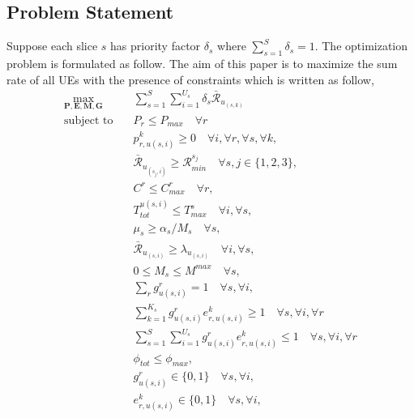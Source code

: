 \documentclass[conference]{IEEEtran}
\begin{document}
\subsection{Problem Statement}
Suppose each slice $s$ has priority factor $\delta_s$ where $\sum_{s=1}^S \delta_s =1$.
The optimization problem is formulated as follow.
The aim of this paper is to maximize the sum rate of all UEs with the presence of constraints which is written as follow,
\begin{subequations}\label{problem}
\begin{alignat}{4}
\max\limits_{\boldsymbol{P}, \boldsymbol{E}, \boldsymbol{M}, \boldsymbol{G} }   \quad &  \sum_{s=1}^{S}\sum_{i=1}^{U_s}\delta_s \bar{\mathcal{R}}_{u_{(s,k)}} \ \\
\text{subject to} \quad  &  P_r \leq P_{max} \quad \forall r
 \label{c11} \\
&p_{r,u(s,i)}^{k}  \geq 0  \quad \forall i,\forall r,\forall s, \forall k,\label{c12} \\
&\bar{\mathcal{R}}_{u_{(s_j,i)}} \geq \mathcal{R}_{min}^{s_j} \quad \forall s, j \in \{1,2,3\}, \label{c13} \\
& C^r \leq C_{max}^r \quad \forall r, \label{c15}\\ 
&T_{tot}^{u(s,i)}  \leq T_{max}^{s} \quad \forall i,\forall s,\label{c16} \\
& \mu_s \geq \alpha_s/M_s \quad \forall s,\label{c16-1} \\
& \bar{\mathcal{R}}_{u_{(s,i)}} \geq {\lambda}_{u_{(s,i)}} \quad \forall i,\forall s,\label{c16-2} \\
& 0 \leq M_s \leq M^{max}  \quad \forall s,\label{c16-3}\\
& \sum_{r}g^r_{u(s,i)} = 1  \quad \forall s,\forall i, \label{c17}  \\
& \sum_{k =1}^{K_s} g^r_{u(s,i)} e^{k}_{r,u(s,i)} \geq 1  \quad \forall s,\forall i ,\forall r \label{c18-1} \\
& \sum_{s =1}^{S}\sum_{i=1}^{U_s}g^r_{u(s,i)} e^{k}_{r,u(s,i)} \leq 1  \quad \forall s,\forall i ,\forall r \label{c18} \\
& \phi_{tot}  \leq \phi_{max}, \label{c19} \\
& g^r_{u(s,i)} \in \{0,1\} \quad \forall s,\forall i, \label{c20}  \\
& e^k_{r,u(s,i)} \in \{0,1\} \quad \forall s,\forall i, \label{c21}  
\end{alignat}
\label{constraints}
\end{subequations}
\end{document}
